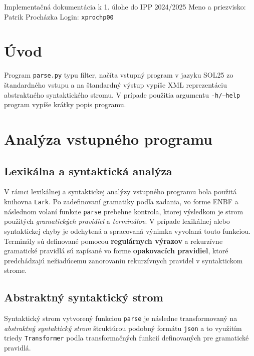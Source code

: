 \documentclass[a4paper, 11pt]{article}
\begin{document}
 {\parindent 0pt \Large
Implementačná dokumentácia k 1. úlohe do IPP 2024/2025\newline
Meno a priezvisko: Patrik Procházka\newline
Login: \texttt{xprochp00}
}

\section{Úvod}
Program \texttt{parse.py} typu filter, načíta vstupný program v jazyku \textsc{SOL25} zo štandardného vstupu a na štandardný výstup vypíše \textsc{XML} reprezentáciu abstraktného syntaktického stromu. V prípade použitia argumentu \texttt{-h/--help} program vypíše krátky popis programu.

\section{Analýza vstupného programu}

\subsection{Lexikálna a syntaktická analýza}
V rámci lexikálnej a syntaktickej analýzy vstupného programu bola použitá knihovna \texttt{Lark}. Po zadefinovaní gramatiky podľa zadania, vo forme \textsc{ENBF} a následnom volaní funkcie \texttt{parse} prebehne kontrola, ktorej výsledkom je strom použitých \emph{gramatických pravidiel} a \emph{terminálov}. V prípade lexikálnej alebo syntaktickej chyby je odchytená a spracovaná výnimka vyvolaná touto funkciou. Terminály sú definované pomocou \textbf{regulárnych výrazov} a rekurzívne gramatické pravidlá sú zapísané vo forme \textbf{opakovacích pravidiel}, ktoré predchádzajú nežiadúcemu zanorovaniu rekurzívnych pravidel v syntaktickom strome.

\subsection{Abstraktný syntaktický strom}
Syntaktický strom vytvorený funkciou \texttt{parse} je následne transformovaný na \emph{abstraktný syntaktický strom} štruktúrou podobný formátu \texttt{json} a to využitím triedy \texttt{Transformer} podľa transformačných funkcií definovaných pre gramatické pravidlá.
\end{document}
